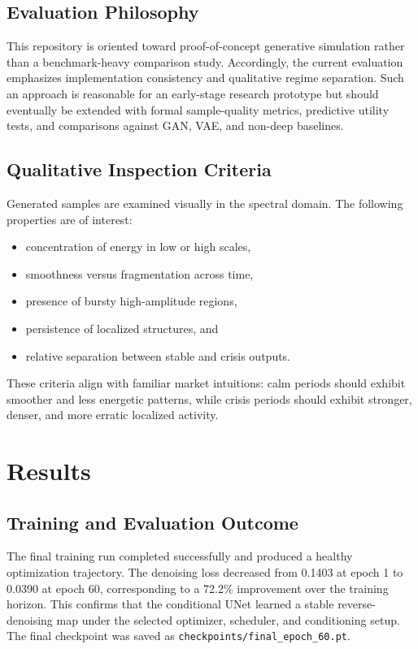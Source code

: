 \documentclass[conference]{IEEEtran}
\begin{document}
\subsection{Evaluation Philosophy}
This repository is oriented toward proof-of-concept generative simulation rather than a benchmark-heavy comparison study. Accordingly, the current evaluation emphasizes implementation consistency and qualitative regime separation. Such an approach is reasonable for an early-stage research prototype but should eventually be extended with formal sample-quality metrics, predictive utility tests, and comparisons against GAN, VAE, and non-deep baselines.

\subsection{Qualitative Inspection Criteria}
Generated samples are examined visually in the spectral domain. The following properties are of interest:
\begin{itemize}
    \item concentration of energy in low or high scales,
    \item smoothness versus fragmentation across time,
    \item presence of bursty high-amplitude regions,
    \item persistence of localized structures, and
    \item relative separation between stable and crisis outputs.
\end{itemize}
These criteria align with familiar market intuitions: calm periods should exhibit smoother and less energetic patterns, while crisis periods should exhibit stronger, denser, and more erratic localized activity.

\section{Results}
\subsection{Training and Evaluation Outcome}
The final training run completed successfully and produced a healthy optimization trajectory. The denoising loss decreased from 0.1403 at epoch 1 to 0.0390 at epoch 60, corresponding to a 72.2\% improvement over the training horizon. This confirms that the conditional UNet learned a stable reverse-denoising map under the selected optimizer, scheduler, and conditioning setup. The final checkpoint was saved as \texttt{checkpoints/final\_epoch\_60.pt}.
\end{document}
